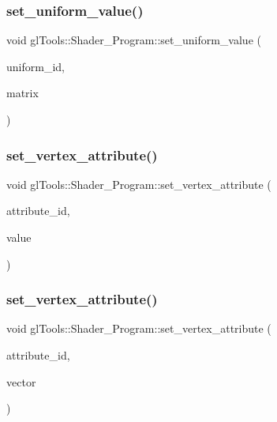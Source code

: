 \mbox{\label{classgl_tools_1_1_shader___program_af8864673c35d1eca9d5062831d421949}} 
\subsubsection{set\_uniform\_value()\hspace{0.1cm}{\footnotesize\ttfamily [8/8]}}
{\footnotesize\ttfamily void gl\+Tools\+::\+Shader\+\_\+\+Program\+::set\+\_\+uniform\+\_\+value (\begin{DoxyParamCaption}\item[{G\+Lint}]{uniform\+\_\+id,  }\item[{const Matrix44f \&}]{matrix }\end{DoxyParamCaption})\hspace{0.3cm}{\ttfamily [inline]}}

\mbox{\label{classgl_tools_1_1_shader___program_afd30955a6968d8c27fe3a53d8afbbffe}} 
\subsubsection{set\_vertex\_attribute()\hspace{0.1cm}{\footnotesize\ttfamily [1/4]}}
{\footnotesize\ttfamily void gl\+Tools\+::\+Shader\+\_\+\+Program\+::set\+\_\+vertex\+\_\+attribute (\begin{DoxyParamCaption}\item[{G\+Lint}]{attribute\+\_\+id,  }\item[{const float \&}]{value }\end{DoxyParamCaption})\hspace{0.3cm}{\ttfamily [inline]}}

\mbox{\label{classgl_tools_1_1_shader___program_a915e94bf783d3840620639e3c5d30990}} 
\subsubsection{set\_vertex\_attribute()\hspace{0.1cm}{\footnotesize\ttfamily [2/4]}}
{\footnotesize\ttfamily void gl\+Tools\+::\+Shader\+\_\+\+Program\+::set\+\_\+vertex\+\_\+attribute (\begin{DoxyParamCaption}\item[{G\+Lint}]{attribute\+\_\+id,  }\item[{const Vector2f \&}]{vector }\end{DoxyParamCaption})\hspace{0.3cm}{\ttfamily [inline]}}

